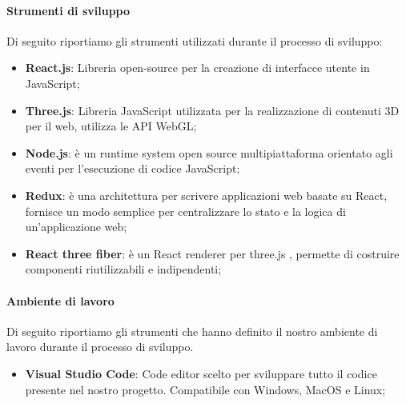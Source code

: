 	\paragraph{Strumenti di sviluppo}
	Di seguito riportiamo gli strumenti utilizzati durante il processo di sviluppo:
		\begin{itemize}
			\item \textbf{React.js}: Libreria open-source per la creazione di interfacce utente in JavaScript;
			\item \textbf{Three.js}: Libreria JavaScript utilizzata per la realizzazione di contenuti 3D per il web, utilizza le API WebGL;
			\item \textbf{Node.js}: è un runtime system open source multipiattaforma orientato agli eventi per l'esecuzione di codice JavaScript;
			\item \textbf{Redux}: è una architettura per scrivere applicazioni web basate su 					React,  fornisce un modo semplice per centralizzare lo stato e la logica di 		un'applicazione web;
			\item \textbf{React three fiber}: è un React renderer per three.js , permette di costruire componenti riutilizzabili e indipendenti;
		\end{itemize}
			
	
	\paragraph{Ambiente di lavoro}
		Di seguito riportiamo gli strumenti che hanno definito il nostro ambiente di lavoro durante il processo di sviluppo.
		\begin{itemize}
			\item \textbf{Visual Studio Code}: Code editor scelto per sviluppare tutto il codice presente nel nostro progetto. Compatibile con Windows, MacOS e Linux;
		\end{itemize}
		
		